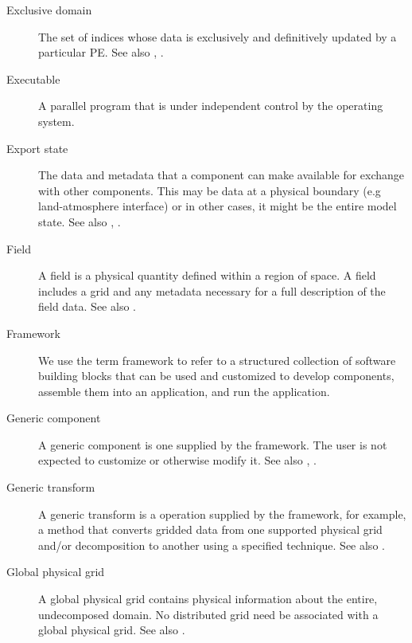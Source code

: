 \begin{description}
\item[Exclusive domain] \label{glos:ExcDomain} The set of indices whose 
  data is exclusively and definitively updated by a particular PE. 
  See also , 
  .

\item[Executable] \label{glos:Exec} 
  A parallel program that is under independent control by the operating 
  system.

\item[Export state] \label{glos:ExportState} The data and metadata that 
  a component can make available for exchange with other components. 
  This may be data at a physical boundary (e.g land-atmosphere interface) 
  or in other cases, it might be the entire model state.  
  See also , 
  .

\item[Field] \label{glos:Field} A field is a physical quantity
  defined within a region of space.  A field includes a grid 
  and any metadata necessary for a full description of the field data.
  See also .

\item[Framework] \label{glos:Framework} We use the term framework to 
  refer to a structured collection of software building blocks that can be used 
  and customized to develop components, assemble them into an application, and 
  run the application.

\item[Generic component] \label{glos:GenericComp} A generic component
  is one supplied by the framework.  The user is not expected to 
  customize or otherwise modify it.  See also , 
  . 

\item[Generic transform] \label{glos:GenericTrans} A generic transform 
  is a operation supplied by the framework, for example, a method 
  that converts gridded data from one supported physical grid and/or 
  decomposition to another using a specified technique.  See also .

\item[Global physical grid] \label{glos:GlobPhysGrid} 
  A global physical grid contains physical information about the entire, 
  undecomposed domain.  No distributed grid need be associated with a global 
  physical grid. See also .  


\end{description}
